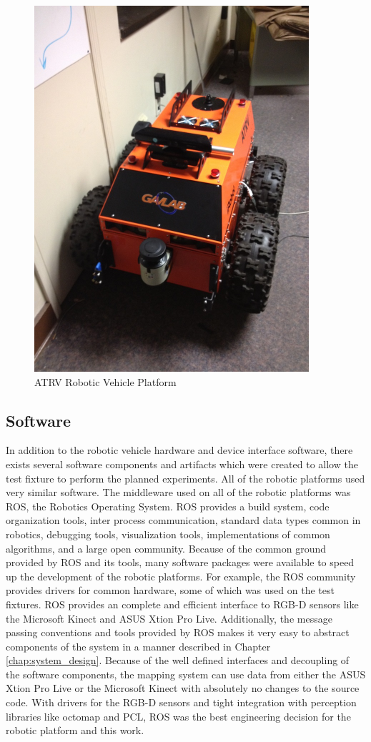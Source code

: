 \documentclass[12pt]{report}
\begin{document}
\begin{figure}[ht]
  \centering
  \includegraphics[width=4in,keepaspectratio]{atrv.jpeg}
  \caption{ATRV Robotic Vehicle Platform}
  \label{fig:atrv}
\end{figure}

\subsection{Software}
In addition to the robotic vehicle hardware and device interface software, there exists several software components and artifacts which were created to allow the test fixture to perform the planned experiments.  All of the robotic platforms used very similar software.  The middleware used on all of the robotic platforms was ROS, the Robotics Operating System\cite{quigley2009ros}.  ROS provides a build system, code organization tools, inter process communication, standard data types common in robotics, debugging tools, visualization tools, implementations of common algorithms, and a large open community.  Because of the common ground provided by ROS and its tools, many software packages were available to speed up the development of the robotic platforms.  For example, the ROS community provides drivers for common hardware, some of which was used on the test fixtures.  ROS provides an complete and efficient interface to RGB-D sensors like the Microsoft Kinect and ASUS Xtion Pro Live.  Additionally, the message passing conventions and tools provided by ROS makes it very easy to abstract components of the system in a manner described in Chapter \ref{chap:system_design}.  Because of the well defined interfaces and decoupling of the software components, the mapping system can use data from either the ASUS Xtion Pro Live or the Microsoft Kinect with absolutely no changes to the source code.  With drivers for the RGB-D sensors and tight integration with perception libraries like octomap and PCL, ROS was the best engineering decision for the robotic platform and this work.
\end{document}
